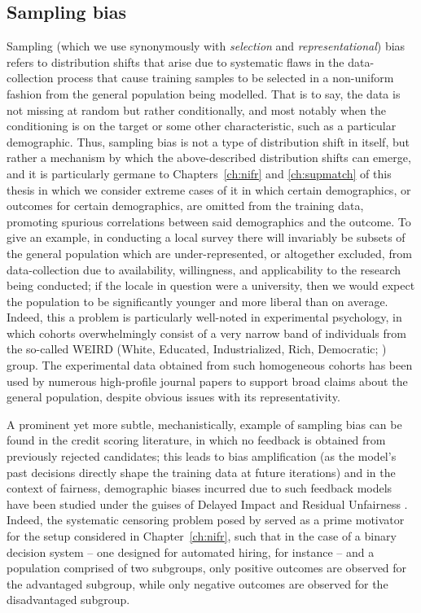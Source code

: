 \subsection{Sampling bias}\label{ssec:sampling-bias}
Sampling (which we use synonymously with \emph{selection} and \emph{representational}) bias refers
to distribution shifts that arise due to systematic flaws in the data-collection process that cause
training samples to be selected in a non-uniform fashion from the general population being
modelled.
%
That is to say, the data is not missing at random but rather conditionally, and most notably when
the conditioning is on the target or some other characteristic, such as a particular demographic.
%
Thus, sampling bias is not a type of distribution shift in itself, but rather a mechanism by which
the above-described distribution shifts can emerge, and it is particularly germane to
Chapters~\ref{ch:nifr} and \ref{ch:supmatch} of this thesis in which we consider extreme cases of
it in which certain demographics, or outcomes for certain demographics, are omitted from the
training data, promoting spurious correlations between said demographics and the outcome.
%
To give an example, in conducting a local survey there will invariably be subsets of the general
population which are under-represented, or altogether excluded, from data-collection due to
availability, willingness, and applicability to the research being conducted; if the locale in
question were a university, then we would expect the population to be significantly younger and
more liberal than on average.
%
Indeed, this a problem is particularly well-noted in experimental psychology, in which cohorts
overwhelmingly consist of a very narrow band of individuals from the so-called WEIRD (White,
Educated, Industrialized, Rich, Democratic; \citet{henrich2010weirdest}) group.
%
The experimental data obtained from such homogeneous cohorts has been used by numerous high-profile
journal papers to support broad claims about the general population, despite obvious issues with
its representativity.

%
A prominent yet more subtle, mechanistically, example of sampling bias can be found in the credit
scoring literature, in which no feedback is obtained from previously rejected candidates; this
leads to bias amplification (as the model's past decisions directly shape the training data at
future iterations) and in the context of fairness, demographic biases incurred due to such feedback
models have been studied under the guises of Delayed Impact \citep{liu2018delayed} and Residual
Unfairness \citep{kallus2018residual}.
%
Indeed, the systematic censoring problem posed by \cite{kallus2018residual} served as a prime
motivator for the setup considered in Chapter~\ref{ch:nifr}, such that in the case of a binary
decision system -- one designed for automated hiring, for instance -- and a population comprised of
two subgroups, only positive outcomes are observed for the advantaged subgroup, while only negative
outcomes are observed for the disadvantaged subgroup.
%
